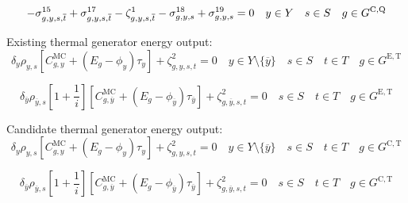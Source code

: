 \documentclass{article}
\newcommand{\sGeneratorsExistingThermal}{G^{\mathrm{E,T}}}
\newcommand{\sGeneratorsCandidateThermal}{G^{\mathrm{C,T}}}
\newcommand{\sStorageCandidate}{G^{\mathrm{C,Q}}}
\newcommand{\sYears}{Y}
\newcommand{\sScenarios}{S}
\newcommand{\sIntervals}{T}
\newcommand{\iGenerator}{g}
\newcommand{\iYear}{y}
\newcommand{\iYearTerminal}{\overline{\iYear}}
\newcommand{\iScenario}{s}
\newcommand{\iInterval}{t}
\newcommand{\iIntervalTerminal}{\overline{\iInterval}}
\newcommand{\cScenarioDuration}[1][\iYear,\iScenario]{\rho_{#1}}
\newcommand{\cMarginalCost}[1][\iGenerator,\iYear]{C^{\mathrm{MC}}_{#1}}
\newcommand{\cEmissionsIntensity}[1][\iGenerator]{E_{#1}}
\newcommand{\cInterestRate}{i}
\newcommand{\cDiscountRate}[1][\iYear]{\delta_{#1}}
\newcommand{\vBaseline}[1][\iYear]{\phi_{#1}}
\newcommand{\vPermitPrice}[1][\iYear]{\tau_{#1}}
\newcommand{\dNonNegativeStorageEnergy}[1][\iGenerator,\iYear,\iScenario,\iInterval]{\sigma_{#1}^{15}}
\newcommand{\dMaxStorageEnergyCandidate}[1][\iGenerator,\iYear,\iScenario,\iInterval]{\sigma_{#1}^{17}}
\newcommand{\dMinStorageEnergyIntervalEnd}[1][\iGenerator,\iYear,\iScenario]{\sigma_{#1}^{18}}
\newcommand{\dMaxStorageEnergyIntervalEnd}[1][\iGenerator,\iYear,\iScenario]{\sigma_{#1}^{19}}
\newcommand{\dStorageEnergyTransition}[1][\iGenerator,\iYear,\iScenario,\iInterval]{\zeta_{#1}^{1}}
\newcommand{\dGeneratorEnergyOutput}[1][\iGenerator,\iYear,\iScenario,\iInterval]{\zeta_{#1}^{2}}
\begin{document}
\begin{equation}
- \dNonNegativeStorageEnergy[\iGenerator,\iYear,\iScenario,\iIntervalTerminal] + \dMaxStorageEnergyCandidate[\iGenerator,\iYear,\iScenario,\iIntervalTerminal] - \dStorageEnergyTransition[\iGenerator,\iYear,\iScenario,\iIntervalTerminal] - \dMinStorageEnergyIntervalEnd + \dMaxStorageEnergyIntervalEnd = 0 \quad \iYear \in \sYears \quad \iScenario \in \sScenarios \quad \iGenerator \in \sStorageCandidate\\
\end{equation}

Existing thermal generator energy output:
\begin{equation}
\cDiscountRate \cScenarioDuration \left[\cMarginalCost + \left(\cEmissionsIntensity - \vBaseline\right)\vPermitPrice \right]  + \dGeneratorEnergyOutput = 0 \quad \iYear \in \sYears \setminus \{\iYearTerminal\} \quad \iScenario \in \sScenarios \quad \iInterval \in \sIntervals \quad \iGenerator \in \sGeneratorsExistingThermal
\end{equation}

\begin{equation}
\cDiscountRate[\iYearTerminal] \cScenarioDuration[\iYearTerminal,\iScenario] \left[1 + \frac{1}{\cInterestRate}\right] \left[\cMarginalCost[\iGenerator,\iYearTerminal] + \left(\cEmissionsIntensity - \vBaseline[\iYearTerminal]\right)\vPermitPrice[\iYearTerminal] \right]  + \dGeneratorEnergyOutput[\iGenerator,\iYearTerminal,\iScenario,\iInterval] = 0 \quad \iScenario \in \sScenarios \quad \iInterval \in \sIntervals \quad \iGenerator \in \sGeneratorsExistingThermal
\end{equation}

Candidate thermal generator energy output:
\begin{equation}
\cDiscountRate \cScenarioDuration \left[\cMarginalCost + \left(\cEmissionsIntensity - \vBaseline\right)\vPermitPrice \right]  + \dGeneratorEnergyOutput = 0 \quad \iYear \in \sYears \setminus \{\iYearTerminal\} \quad \iScenario \in \sScenarios \quad \iInterval \in \sIntervals \quad \iGenerator \in \sGeneratorsCandidateThermal
\end{equation}

\begin{equation}
\cDiscountRate[\iYearTerminal] \cScenarioDuration[\iYearTerminal,\iScenario] \left[1 + \frac{1}{\cInterestRate}\right] \left[\cMarginalCost[\iGenerator,\iYearTerminal] + \left(\cEmissionsIntensity - \vBaseline[\iYearTerminal]\right)\vPermitPrice[\iYearTerminal] \right]  + \dGeneratorEnergyOutput[\iGenerator,\iYearTerminal,\iScenario,\iInterval] = 0 \quad \iScenario \in \sScenarios \quad \iInterval \in \sIntervals \quad \iGenerator \in \sGeneratorsCandidateThermal
\end{equation}
\end{document}
